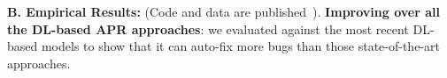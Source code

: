 

{\bf B. Empirical Results:} (Code and data are published~\cite{AutoFix2019}).
{\bf Improving over all the DL-based APR approaches}: we evaluated
{\tool} against the most recent DL-based models to show that it can
auto-fix more bugs than those state-of-the-art approaches.




